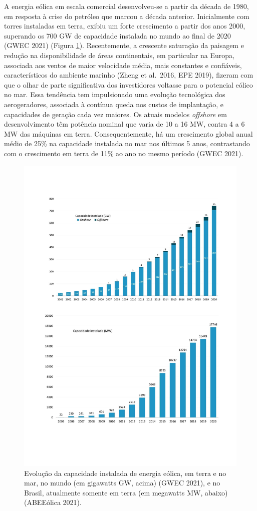 \documentclass[
  oneside]{scrbook}
\begin{document}
A energia eólica em escala comercial desenvolveu-se a partir da década de 1980, em resposta à crise do petróleo que marcou a década anterior. Inicialmente com torres instaladas em terra, exibiu um forte crescimento a partir dos anos 2000, superando os 700 GW de capacidade instalada no mundo ao final de 2020 (GWEC 2021) (Figura \ref{fig:61}). Recentemente, a crescente saturação da paisagem e redução na disponibilidade de áreas continentais, em particular na Europa, associada aos ventos de maior velocidade média, mais constantes e confiáveis, característicos do ambiente marinho (Zheng et al.~2016, EPE 2019), fizeram com que o olhar de parte significativa dos investidores voltasse para o potencial eólico no mar. Essa tendência tem impulsionado uma evolução tecnológica dos aerogeradores, associada à contínua queda nos custos de implantação, e capacidades de geração cada vez maiores. Os atuais modelos \emph{offshore} em desenvolvimento têm potência nominal que varia de 10 a 16 MW, contra 4 a 6 MW das máquinas em terra. Consequentemente, há um crescimento global anual médio de 25\% na capacidade instalada no mar nos últimos 5 anos, contrastando com o crescimento em terra de 11\% ao ano no mesmo período (GWEC 2021).

\begin{figure}[H]

{\centering \includegraphics[width=0.9\linewidth]{imagens/cap08/Figura_8.1ab} 

}

\caption{Evolução da capacidade instalada de energia eólica, em terra e no mar, no mundo (em gigawatts GW, acima) (GWEC 2021), e no Brasil, atualmente somente em terra (em megawatts MW, abaixo) (ABEEólica 2021).}\label{fig:61}
\end{figure}
\end{document}
